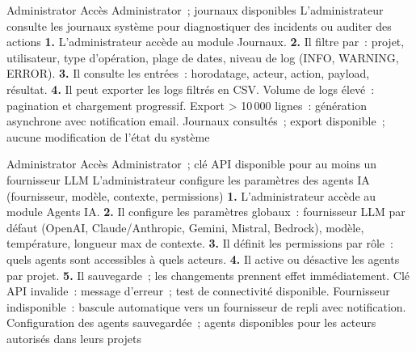   {Administrator}
  {Accès Administrator~; journaux disponibles}
  {L'administrateur consulte les journaux système pour diagnostiquer des incidents ou auditer des actions}
  {\textbf{1.} L'administrateur accède au module Journaux. \textbf{2.} Il filtre par~: projet, utilisateur, type d'opération, plage de dates, niveau de log (INFO, WARNING, ERROR). \textbf{3.} Il consulte les entrées~: horodatage, acteur, action, payload, résultat. \textbf{4.} Il peut exporter les logs filtrés en CSV.}
  {Volume de logs élevé~: pagination et chargement progressif. Export > 10\,000 lignes~: génération asynchrone avec notification email.}
  {Journaux consultés~; export disponible~; aucune modification de l'état du système}

  {Administrator}
  {Accès Administrator~; clé API disponible pour au moins un fournisseur LLM}
  {L'administrateur configure les paramètres des agents IA (fournisseur, modèle, contexte, permissions)}
  {\textbf{1.} L'administrateur accède au module Agents IA. \textbf{2.} Il configure les paramètres globaux~: fournisseur LLM par défaut (OpenAI, Claude/Anthropic, Gemini, Mistral, Bedrock), modèle, température, longueur max de contexte. \textbf{3.} Il définit les permissions par rôle~: quels agents sont accessibles à quels acteurs. \textbf{4.} Il active ou désactive les agents par projet. \textbf{5.} Il sauvegarde~; les changements prennent effet immédiatement.}
  {Clé API invalide~: message d'erreur~; test de connectivité disponible. Fournisseur indisponible~: bascule automatique vers un fournisseur de repli avec notification.}
  {Configuration des agents sauvegardée~; agents disponibles pour les acteurs autorisés dans leurs projets}
